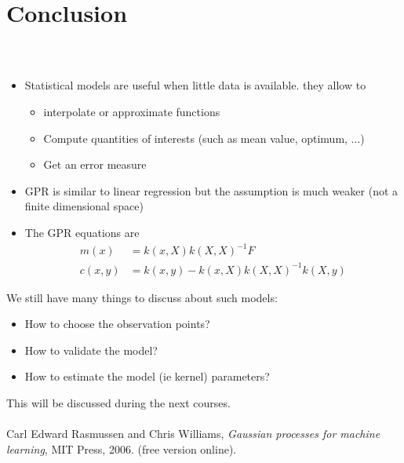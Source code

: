 \documentclass{beamer}
\begin{document}
\section{Conclusion}
\subsection{}

\begin{frame}{}
\\ \vspace{3mm}
\begin{itemize}
	\item Statistical models are useful when little data is available. they allow to
	\begin{itemize}
		\item interpolate or approximate functions
		\item Compute quantities of interests (such as mean value, optimum, ...)
		\item Get an error measure
	\end{itemize}
	\item GPR is similar to linear regression but the assumption is much weaker (not a finite dimensional space)
	\item The GPR equations are
	\begin{equation*}
		\begin{split}
			m(x) & = k(x,X)k(X,X)^{-1}F\\
			c(x,y) &= k(x,y) - k(x,X)k(X,X)^{-1}k(X,y)
		\end{split}
	\end{equation*}
\end{itemize}
\end{frame}

\begin{frame}{}
We still have many things to discuss about such models:
\begin{itemize}
	\item How to choose the observation points?
	\item How to validate the model?
	\item How to estimate the model (ie kernel) parameters?
\end{itemize}
This will be discussed during the next courses.\\
\vspace{10mm}
\\
Carl Edward Rasmussen and Chris Williams, \emph{Gaussian processes for machine learning}, MIT Press, 2006. (free version online).
\end{frame}


\end{document}
